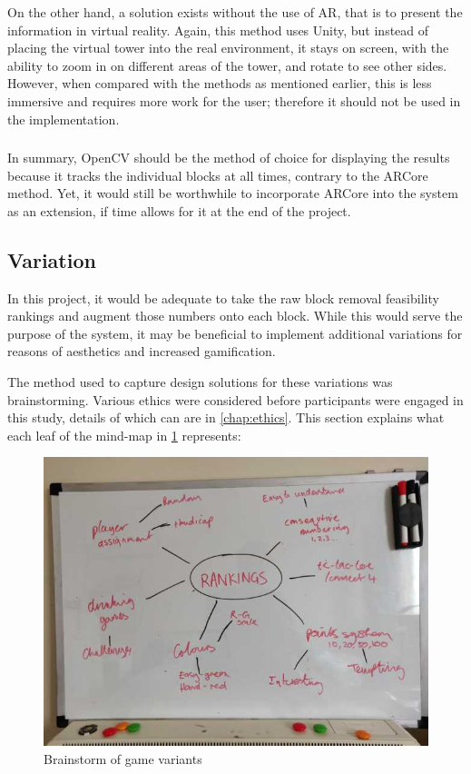 On the other hand, a solution exists without the use of AR, that is to present the information in virtual reality. Again, this method uses Unity, but instead of placing the virtual tower into the real environment, it stays on screen, with the ability to zoom in on different areas of the tower, and rotate to see other sides. However, when compared with the methods as mentioned earlier, this is less immersive and requires more work for the user; therefore it should not be used in the implementation.

\subsubsection{}
In summary, OpenCV should be the method of choice for displaying the results because it tracks the individual blocks at all times, contrary to the ARCore method. Yet, it would still be worthwhile to incorporate ARCore into the system as an extension, if time allows for it at the end of the project.

\subsection{Variation}\label{subsec:variation}
In this project, it would be adequate to take the raw block removal feasibility rankings and augment those numbers onto each block. While this would serve the purpose of the system, it may be beneficial to implement additional variations for reasons of aesthetics and increased gamification.

The method used to capture design solutions for these variations was brainstorming. Various ethics were considered before participants were engaged in this study, details of which can are in \cref{chap:ethics}. This section explains what each leaf of the mind-map in \cref{fig:brainstorm} represents:

\begin{figure}[ht]
  \includegraphics[width=\linewidth]{images/design/rankings}
  \caption{Brainstorm of game variants}
  \label{fig:brainstorm}
\end{figure}

